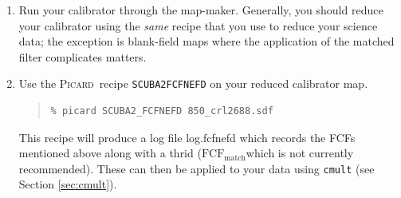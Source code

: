 \documentclass[twoside,11pt]{article}
\newcommand{\xref}[3]{#1}
\renewcommand{\_}{\texttt{\symbol{95}}}
\newenvironment{myquote}{\begin{quote}\begin{small}}{\end{small}\end{quote}}
\newcommand{\fcfm}{$\mathrm{FCF_{match}}$}
\newcommand{\picard}{\xref{\textsc{Picard}}{sun265}{}}
\begin{document}
\begin{enumerate}
\item Run your calibrator through the map-maker. Generally, you should reduce your calibrator using the \emph{same} recipe that you use to reduce your science data; the exception is blank-field maps where the application of the matched filter complicates matters.

\item Use the \picard\ recipe \texttt{SCUBA2\_FCFNEFD} on your reduced calibrator map. 
\begin{myquote}
\begin{verbatim}
% picard SCUBA2_FCFNEFD 850_crl2688.sdf
\end{verbatim}
\end{myquote}
This recipe will produce a log file log.fcfnefd which records the FCFs mentioned above along with a thrid (\fcfm which is not currently recommended). These can then be applied to your data using \texttt{cmult} (see Section \ref{sec:cmult}).
\end{enumerate}


\clearpage
\end{document}
